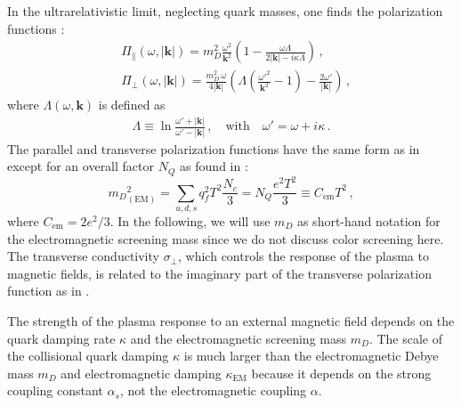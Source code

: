 In the ultrarelativistic limit, neglecting quark masses, one finds the polarization functions \cite{Formanek:2021blc}:
\begin{align}\label{eq:polfuncsUltra}
&\Pi_{\parallel}(\omega,|\boldsymbol{k}|) = m_D^2\frac{\omega^2}{\boldsymbol{k}^2}\left(1 - \frac{\omega \Lambda}{2|\boldsymbol{k}|-i\kappa \Lambda}\right)\,,\\
&\Pi_{\perp}(\omega,|\boldsymbol{k}|) = \frac{m_D^2\,\omega}{4 |\boldsymbol{k}|}\left( \Lambda \left(\frac{\omega'^2}{\boldsymbol{k}^2} - 1\right) - \frac{2\omega'}{ |\boldsymbol{k}|}\right)\,,
\end{align}
where $\Lambda(\omega,\boldsymbol{k})$ is defined as
\begin{align}\label{eq:definitions}
 \Lambda \equiv \ln \frac{\omega'+  |\boldsymbol{k}|}{\omega'- |\boldsymbol{k}|}\,, \quad \text{with} \quad \omega' = \omega+i\kappa\,.
\end{align}
The parallel and transverse polarization functions have the same form as in \cite{Formanek:2021blc} except for an overall factor $N_Q$  as found in \cite{Kapusta:1992fm,Grayson:2022asf}:
\begin{equation}\label{eq:DebyemQCD}
    {m_D}^2_{(\text{EM})} = \sum_{u,d,s} q^2_f T^2 \frac{N_c}{3} = N_Q\frac{e^2T^2}{3} \equiv C_{\text{em}}T^2\,,
\end{equation}
where $C_{\text{em}} =  2e^2/3$. In the following, we will use $m_D$ as short-hand notation for the electromagnetic screening mass since we do not discuss color screening here.
The transverse conductivity $\sigma_{\perp}$, which controls the response of the plasma to magnetic fields, is related to the imaginary part of the transverse polarization function as in .

The strength of the plasma response to an external magnetic field depends on the quark damping rate $\kappa$ and the electromagnetic screening mass $m_D$. The scale of the collisional quark damping $\kappa$ is much larger than the electromagnetic Debye mass $m_D$ and electromagnetic damping $\kappa_{\text{EM}}$ because it depends on the strong coupling constant $\alpha_s$, not the electromagnetic coupling $\alpha$.

